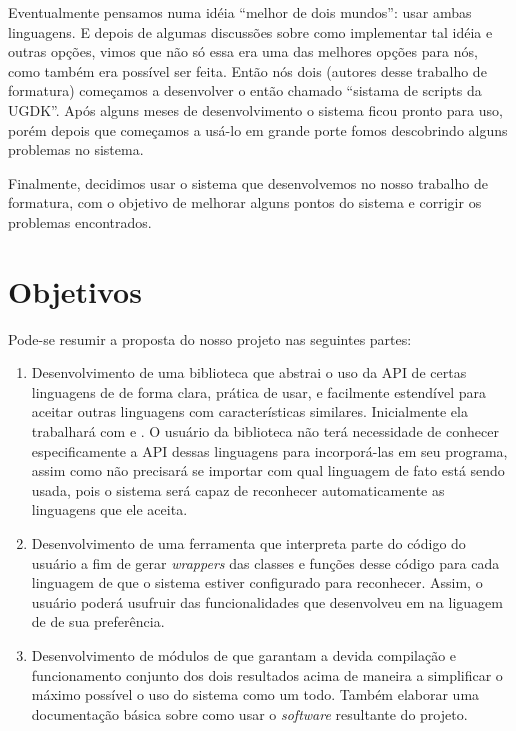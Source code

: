 Eventualmente pensamos numa idéia ``melhor de dois mundos'': usar ambas linguagens.
E depois de algumas discussões sobre como implementar tal idéia e outras opções,
vimos que não só essa era uma das melhores opções para nós, como também era
possível ser feita. Então nós dois (autores desse trabalho de formatura) começamos
a desenvolver o então chamado ``sistama de scripts da UGDK''. Após alguns meses
de desenvolvimento o sistema ficou pronto para uso, porém depois que começamos 
a usá-lo em grande porte fomos descobrindo alguns problemas no sistema.

Finalmente, decidimos usar o sistema que desenvolvemos no nosso trabalho de 
formatura, com o objetivo de melhorar alguns pontos do sistema e corrigir
os problemas encontrados.

\section{Objetivos}
\label{sec:intr:objetivos}

Pode-se resumir a proposta do nosso projeto nas seguintes partes:

\begin{enumerate}
  \item Desenvolvimento de uma biblioteca \CXX{} que abstrai o uso da API de
        certas linguagens de \script{} de forma clara, prática de usar, e
        facilmente estendível para aceitar outras linguagens com características
        similares. Inicialmente ela trabalhará com  e . O
        usuário da biblioteca não terá necessidade de conhecer especificamente a
        API dessas linguagens para incorporá-las em seu programa, assim como não
        precisará se importar com qual linguagem de fato está sendo usada, pois
        o sistema será capaz de reconhecer automaticamente as linguagens que ele
        aceita.
  \item Desenvolvimento de uma ferramenta que interpreta parte do código \CXX{}
        do usuário a fim de gerar \emph{wrappers}\footnotemark{} das classes e
        funções desse código para cada linguagem de \script{} que o sistema
        estiver configurado para reconhecer. Assim, o usuário poderá usufruir
        das funcionalidades que desenvolveu em \CXX{} na liguagem de \script{}
        de sua preferência.
  \item Desenvolvimento de módulos de  que garantam a devida
        compilação e funcionamento conjunto dos dois resultados acima de maneira
        a simplificar o máximo possível o uso do sistema como um todo. Também
        elaborar uma documentação básica sobre como usar o \emph{software}
        resultante do projeto.

\end{enumerate}

